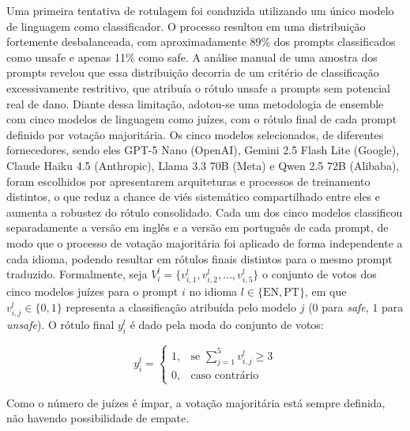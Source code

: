 Uma primeira tentativa de rotulagem foi conduzida utilizando um único modelo de linguagem como classificador. O processo resultou em uma distribuição fortemente desbalanceada, com aproximadamente 89\% dos prompts classificados como unsafe e apenas 11\% como safe. A análise manual de uma amostra dos prompts revelou que essa distribuição decorria de um critério de classificação excessivamente restritivo, que atribuía o rótulo unsafe a prompts sem potencial real de dano. Diante dessa limitação, adotou-se uma metodologia de ensemble com cinco modelos de linguagem como juízes, com o rótulo final de cada prompt definido por votação majoritária. Os cinco modelos selecionados, de diferentes fornecedores, sendo eles GPT-5 Nano (OpenAI), Gemini 2.5 Flash Lite (Google), Claude Haiku 4.5 (Anthropic), Llama 3.3 70B (Meta) e Qwen 2.5 72B (Alibaba), foram escolhidos por apresentarem arquiteturas e processos de treinamento distintos, o que reduz a chance de viés sistemático compartilhado entre eles e aumenta a robustez do rótulo consolidado. Cada um dos cinco modelos classificou separadamente a versão em inglês e a versão em português de cada prompt, de modo que o processo de votação majoritária foi aplicado de forma independente a cada idioma, podendo resultar em rótulos finais distintos para o mesmo prompt traduzido. Formalmente, seja $V_i^{l} = \{v_{i,1}^{l}, v_{i,2}^{l}, \dots, v_{i,5}^{l}\}$ o conjunto de votos dos cinco modelos juízes para o prompt $i$ no idioma $l \in \{\text{EN}, \text{PT}\}$, em que $v_{i,j}^{l} \in \{0, 1\}$ representa a classificação atribuída pelo modelo $j$ ($0$ para \textit{safe}, $1$ para \textit{unsafe}). O rótulo final $y_i^{l}$ é dado pela moda do conjunto de votos:

\begin{equation}
	y_i^{l} = 
	\begin{cases} 
		1, & \text{se } \displaystyle\sum_{j=1}^{5} v_{i,j}^{l} \geq 3 \\
		0, & \text{caso contrário}
	\end{cases}
	\label{eq:votacao-majoritaria}
\end{equation}

Como o número de juízes é ímpar, a votação majoritária está sempre definida, não havendo possibilidade de empate.

